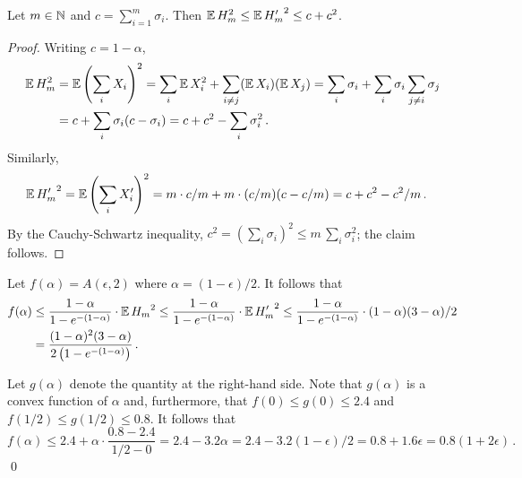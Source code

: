   \begin{fact}\label{fact:second-moment-equal-unequal-stake}
    Let $m \in \mathbb{N}$ and $c = \sum_{i = 1}^m \sigma_i$. 
    Then $\operatorname{\mathbb{E}} H_m^2 \leq \operatorname{\mathbb{E}} {H'_m}^2 \leq c + c^2$.
  \end{fact}
  \begin{proof}
    Writing $c = 1 - \alpha$, 
    \begin{align*}
      \operatorname{\mathbb{E}} H_m^2 
      &=\operatorname{\mathbb{E}} \left(\sum_i X_i\right)^2 
      = \sum_i \operatorname{\mathbb{E}} X_i^2 + \sum_{i \neq j} (\operatorname{\mathbb{E}} X_i)(\operatorname{\mathbb{E}} X_j) 
      = \sum_i \sigma_i + \sum_i \sigma_i \sum_{j \neq i} \sigma_j \\ 
      &= c + \sum_i \sigma_i (c - \sigma_i) 
      = c + c^2 - \sum_i{\sigma_i^2}
      \,.      
    \end{align*}
    Similarly,
    \begin{align*}
      \operatorname{\mathbb{E}} {H'_m}^2 
      &=\operatorname{\mathbb{E}} \left(\sum_i X'_i\right)^2 
      = m \cdot c/m + m \cdot (c/m) (c - c/m) 
      = c + c^2 - c^2/m
      \,.      
    \end{align*}
    By the Cauchy-Schwartz inequality, 
    $
      c^2 = \left(\sum_i \sigma_i \right)^2 \leq m \, \sum_i \sigma_i^2
    $; the claim follows.
  \end{proof}

  Let $f(\alpha) = A(\epsilon, 2)$ where $\alpha = (1-\epsilon)/2$.
  It follows that 
  \begin{align*}
    f(\alpha) 
    &\leq \frac{1 - \alpha}{1 - e^{-(1 - \alpha)}} \cdot \operatorname{\mathbb{E}} {H_m}^2
    \leq \frac{1 - \alpha}{1 - e^{-(1 - \alpha)}} \cdot \operatorname{\mathbb{E}} {H'_m}^2
    \leq \frac{1 - \alpha}{1 - e^{-(1 - \alpha)}} \cdot (1-\alpha) (3 - \alpha)/2 \\
    &= \frac{(1 - \alpha)^2 (3 - \alpha)}{2 \left( 1 - e^{-(1 - \alpha)} \right)}
    \,.
  \end{align*}

  Let $g(\alpha)$ denote the quantity at the right-hand side. 
  Note that $g(\alpha)$ is a convex function of $\alpha$ 
  and, furthermore, that $f(0)\leq g(0) \leq 2.4$ 
  and $f(1/2) \leq g(1/2) \leq 0.8$.
  It follows that 
  $$
  f(\alpha) 
  \leq 2.4 + \alpha \cdot \frac{0.8-2.4}{1/2 - 0}
  = 2.4 - 3.2 \alpha
  = 2.4 - 3.2 (1 - \epsilon)/2
  = 0.8  + 1.6 \epsilon
  = 0.8 (1 + 2 \epsilon)
  \,.
  $$
  \hfill\qed